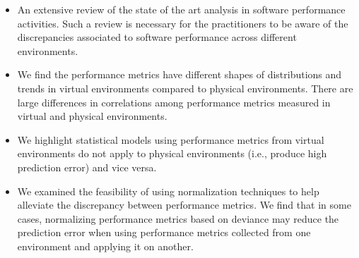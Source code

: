 \begin{itemize}
	\item An extensive review of the state of the art analysis in software performance activities. Such a review is necessary for the practitioners to be aware of the discrepancies associated to software performance across different environments.
	
	\item We find the performance metrics have different shapes of distributions and trends in virtual environments compared to physical environments. There are large differences in correlations among performance metrics measured in virtual and physical environments.
	\item We highlight statistical models using performance metrics from virtual environments do not apply to physical environments (i.e., produce high prediction error) and vice versa.
	\item  We examined the feasibility of using normalization techniques to help alleviate the discrepancy between performance metrics. We find that in some cases, normalizing performance metrics based on deviance may reduce the prediction error when using performance metrics collected from one environment and applying it on another. 
\end{itemize}